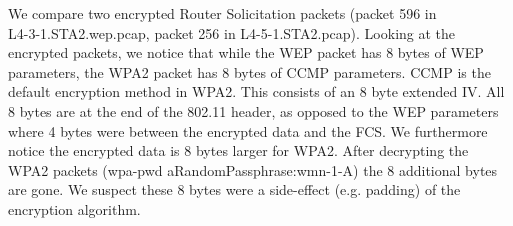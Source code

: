 We compare two encrypted Router Solicitation packets (packet 596 in \\L4-3-1.STA2.wep.pcap, packet 256 in L4-5-1.STA2.pcap). Looking at the encrypted packets, we notice that while the WEP packet has 8 bytes of WEP parameters, the WPA2 packet has 8 bytes of CCMP parameters. CCMP is the default encryption method in WPA2. This consists of an 8 byte extended IV. All 8 bytes are at the end of the 802.11 header, as opposed to the WEP parameters where 4 bytes were between the encrypted data and the FCS. We furthermore notice the encrypted data is 8 bytes larger for WPA2. After decrypting the WPA2 packets (wpa-pwd aRandomPassphrase:wmn-1-A) the 8 additional bytes are gone. We suspect these 8 bytes were a side-effect (e.g. padding) of the encryption algorithm.
